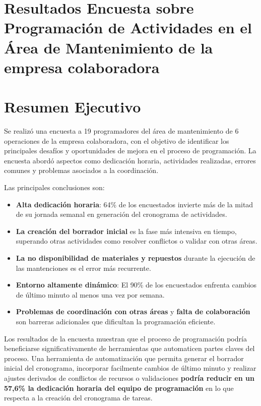 \documentclass{article}
\begin{document}
\begin{appendix}
    \section{Resultados Encuesta sobre Programación de Actividades en el Área de Mantenimiento de la empresa colaboradora}
    \label{anexo:encuesta}

    \section*{Resumen Ejecutivo}

    Se realizó una encuesta a 19 programadores del área de mantenimiento de 6 operaciones de la empresa colaboradora, con el objetivo de identificar los principales desafíos y oportunidades de mejora en el proceso de programación. La encuesta abordó aspectos como dedicación horaria, actividades realizadas, errores comunes y problemas asociados a la coordinación.
    
    Las principales conclusiones son:
    
    \begin{itemize}
        \item \textbf{Alta dedicación horaria}: 64\% de los encuestados invierte más de la mitad de su jornada semanal en generación del cronograma de actividades.
        \item \textbf{La creación del borrador inicial} es la fase más intensiva en tiempo, superando otras actividades como resolver conflictos o validar con otras áreas.
        \item \textbf{La no disponibilidad de materiales y repuestos} durante la ejecución de las mantenciones es el error más recurrente.
        \item \textbf{Entorno altamente dinámico}: El 90\% de los encuestados enfrenta cambios de último minuto al menos una vez por semana.
        \item \textbf{Problemas de coordinación con otras áreas} y \textbf{falta de colaboración} son barreras adicionales que dificultan la programación eficiente.
    \end{itemize}
    
    Los resultados de la encuesta muestran que el proceso de programación podría beneficiarse significativamente de herramientas que automaticen partes claves del proceso. Una herramienta de automatización que permita generar el borrador inicial del cronograma, incorporar facilmente cambios de último minuto y realizar ajustes derivados de conflictos de recursos o validaciones \textbf{podría reducir en un 57,6\% la dedicación horaria del equipo de programación} en lo que respecta a la creación del cronograma de tareas. 
    

\end{appendix}
\end{document}

